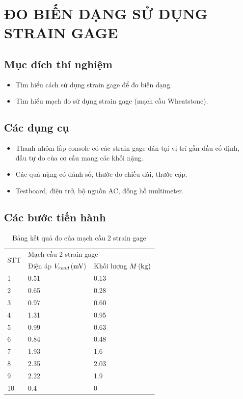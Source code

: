 \chapter{ĐO BIẾN DẠNG SỬ DỤNG STRAIN GAGE}

\section{Mục đích thí nghiệm}
\begin{itemize}
	\item Tìm hiểu cách sử dụng strain gage để đo biến dạng.
	\item Tìm hiểu mạch đo sử dụng strain gage (mạch cầu Wheatstone).
\end{itemize}

\section{Các dụng cụ}
\begin{itemize}
	\item Thanh nhôm lắp console có các strain gage dán tại vị trí gần đầu cố định, đầu tự do của cơ cấu mang các khối nặng.
	\item Các quả nặng có đánh số, thước đo chiều dài, thước cặp.
	\item Testboard, điện trở, bộ nguồn AC, đồng hồ multimeter.
\end{itemize}

\section{Các bước tiến hành}

\begin{table}[ht]
	\centering
	\caption{Bảng kết quả đo của mạch cầu 2 strain gage}
	\begin{tabular}{lll}\toprule
		\multirow{2}{*}{STT} & \multicolumn{2}{l}{Mạch cầu 2 strain gage}\\ \cmidrule{2-3}
		& Điện áp $ V_{read}\, (\mathrm{mV}) $ & Khối lượng $ M\, (\mathrm{kg}) $\\\midrule
		1 & 0.51 & 0.13 \\
		2 & 0.65 & 0.28 \\
		3 & 0.97 & 0.60 \\
		4 & 1.31 & 0.95 \\
		5 & 0.99 & 0.63 \\
		6 & 0.84 & 0.48 \\
		7 & 1.93 & 1.6 \\
		8 & 2.35 & 2.03 \\
		9 & 2.22 & 1.9 \\
		10 & 0.4 & 0 \\\bottomrule
	\end{tabular}
\end{table}

